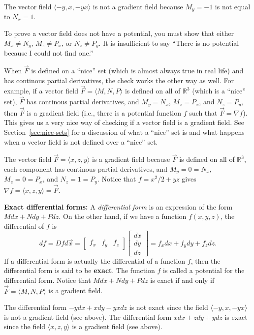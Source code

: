 \begin{example}
The vector field $\langle-y,x,-yx\rangle$ is not a
  gradient field because {$M_y=-1$} is not equal to {$N_x=1$}.
\end{example}
To prove a vector field does not have a potential, you must show that
either $M_x\neq N_y$, $M_z\neq P_x$, or $N_z\neq P_y$. It is insufficient to
say ``There is no potential because I could not find one.''


When $\vec F$ is defined on a ``nice'' set (which is almost always
true in real life) and has continous partial derivatives, the check
works the other way as well.  For example, if a vector field $\vec
F=\langle M,N,P\rangle$ is defined on all of $\mathbb{R}^3$ (which is a ``nice''
set), $\vec F$ has continous partial derivatives, and $M_y=N_x$,
$M_z=P_x$, and $N_z=P_y$, then $\vec F$ is a gradient field (i.e.,
there is a potential function $f$ such that $\vec F = \nabla f$).  This
gives us a very nice way of checking if a vector field is a gradient
field.  See Section~\ref{sec:nice-sets} for a discussion of what a ``nice'' set is
and what happens when a vector field is not defined over a ``nice''
set.


\begin{example}
The vector field $\vec F=\langle x,z,y\rangle$ is
  a gradient field because $\vec F$ is defined on all of
  $\mathbb{R}^3$, each component has continous partial derivatives,
  and $M_y=0=N_x$, $M_z=0=P_x$, and $N_z=1=P_y$.  Notice that
  $f=x^2/2+yz$ gives $\nabla f = \langle x,z,y\rangle=\vec F$.
\end{example}

\textbf{Exact differential forms:} A \emph{differential form} is an
expression of the form {$Mdx+Ndy+Pdz$}.  On the other hand, if we have
a function $f(x,y,z)$, the differential of $f$ is 
$$df = Df d\vec x
= \begin{bmatrix}f_x&f_y&f_z
\end{bmatrix}\begin{bmatrix}dx\\dy\\dz\end{bmatrix}=f_x dx+f_y dy+f_z
dz.$$ If a differential form is actually the differential of a
function {$f$}, then the differential form is said to be
\textbf{exact}.  The function {$f$} is called a potential for the
differential form.  Notice that {$Mdx+Ndy+Pdz$} is exact if and only
if {$\vec F = \langle M,N,P\rangle$} is a gradient field.

\begin{example}
The differential form $-ydx+xdy-yxdz$ is not
  exact since the field $\langle-y,x,-yx\rangle$ is not a gradient
  field (see above).  The differential form $xdx+zdy+ydz$ is exact
  since the field $\langle x,z,y\rangle$ is a gradient field (see
  above).
\end{example}
